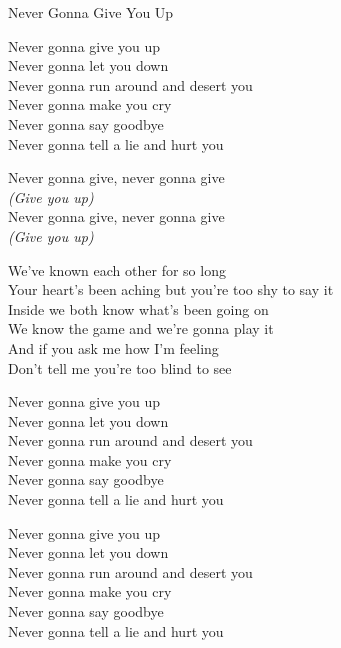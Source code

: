 \begin{song}{Never Gonna Give You Up}
  \begin{SBChorus}
    Never gonna give you up\\
    Never gonna let you down\\
    Never gonna run around and desert you\\
    Never gonna make you cry\\
    Never gonna say goodbye\\
    Never gonna tell a lie and hurt you
  \end{SBChorus}



  \begin{SBSection*}
    Never gonna give, never gonna give\\
    \emph{(Give you up)}\\
    Never gonna give, never gonna give\\
    \emph{(Give you up)}
  \end{SBSection*}

  \begin{SBVerse}
    We've known each other for so long\\
    Your heart's been aching but you're too shy to say it\\
    Inside we both know what's been going on\\
    We know the game and we're gonna play it\\\medskip
    And if you ask me how I'm feeling\\
    Don't tell me you're too blind to see
  \end{SBVerse}

  \begin{SBChorus}
    Never gonna give you up\\
    Never gonna let you down\\
    Never gonna run around and desert you\\
    Never gonna make you cry\\
    Never gonna say goodbye\\
    Never gonna tell a lie and hurt you
  \end{SBChorus}

  \begin{SBChorus}
    Never gonna give you up\\
    Never gonna let you down\\
    Never gonna run around and desert you\\
    Never gonna make you cry\\
    Never gonna say goodbye\\
    Never gonna tell a lie and hurt you
  \end{SBChorus}


\end{song}
